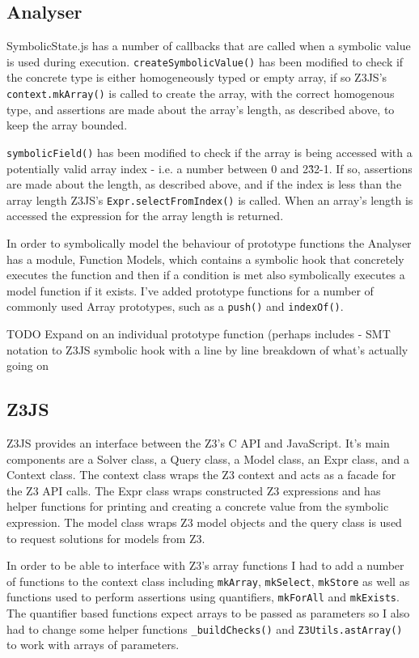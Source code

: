 \documentclass[]{final_report}
\begin{document}
\subsection{Analyser}
SymbolicState.js has a number of callbacks that are called when a symbolic value is used during execution. \lstinline{createSymbolicValue()} has been modified to check if the concrete type is either homogeneously typed or empty array, if so Z3JS’s \lstinline{context.mkArray()} is called to create the array, with the correct homogenous type, and assertions are made about the array’s length, as described above, to keep the array bounded. 

\lstinline{symbolicField()} has been modified to check if the array is being accessed with a potentially valid array index - i.e. a number between 0 and 2\^32-1. If so, assertions are made about the length, as described above, and if the index is less than the array length Z3JS’s \lstinline{Expr.selectFromIndex()} is called. When an array’s length is accessed the expression for the array length is returned.

In order to symbolically model the behaviour of prototype functions the Analyser has a module, Function Models, which contains a symbolic hook that concretely executes the function and then if a condition is met also symbolically executes a model function if it exists.  I’ve added prototype functions for a number of commonly used Array prototypes, such as a \lstinline{push()} and \lstinline{indexOf()}.

TODO Expand on an individual prototype function (perhaps includes - SMT notation to Z3JS symbolic hook with a line by line breakdown of what’s actually going on

\subsection{Z3JS}
Z3JS provides an interface between the Z3’s C API and JavaScript. It’s main components are a Solver class, a Query class, a Model class, an Expr class, and a Context class. The context class wraps the Z3 context and acts as a facade for the Z3 API calls. The Expr class wraps constructed Z3 expressions and has helper functions for printing and creating a concrete value from the symbolic expression. The model class wraps Z3 model objects and the query class is used to request solutions for models from Z3.

In order to be able to interface with Z3’s array functions I had to add a number of functions to the context class including \lstinline{mkArray}, \lstinline{mkSelect}, \lstinline{mkStore} as well as functions used to perform assertions using quantifiers, \lstinline{mkForAll} and \lstinline{mkExists}. The quantifier based functions expect arrays to be passed as parameters so I also had to change some helper functions \lstinline{_buildChecks()} and \lstinline{Z3Utils.astArray()} to work with arrays of parameters.
\end{document}
